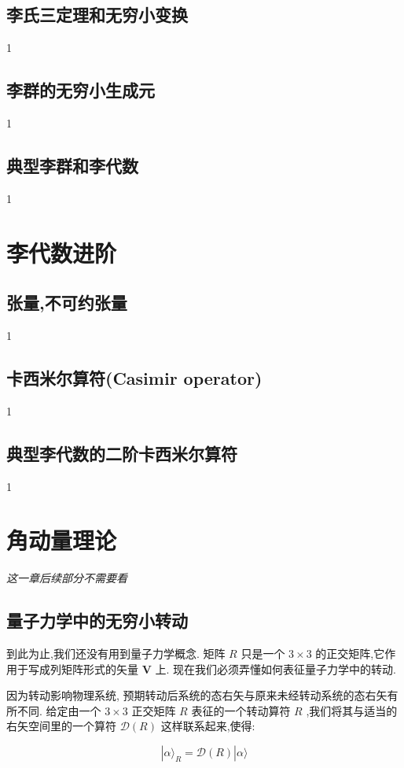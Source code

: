 \subsection{李氏三定理和无穷小变换}
1
\subsection{李群的无穷小生成元}
1
\subsection{典型李群和李代数}
1
\section{李代数进阶}
\subsection{张量,不可约张量}
1
\subsection{卡西米尔算符(Casimir operator)}
1
\subsection{典型李代数的二阶卡西米尔算符}
1


\section{角动量理论}
\textit{这一章后续部分不需要看}
\subsection{量子力学中的无穷小转动} 

到此为止,我们还没有用到量子力学概念. 矩阵 $R$ 只是一个 $3 \times 3$ 的正交矩阵,它作用于写成列矩阵形式的矢量 $\mathbf{V}$ 上. 现在我们必须弄懂如何表征量子力学中的转动.

因为转动影响物理系统, 预期转动后系统的态右矢与原来未经转动系统的态右矢有所不同. 给定由一个 $3 \times 3$ 正交矩阵 $R$ 表征的一个转动算符 $R$ ,我们将其与适当的右矢空间里的一个算符 $\mathcal{D}\left( R\right)$ 这样联系起来,使得:

$$
|\alpha {\rangle }_{R} = \mathcal{D}\left( R\right) |\alpha \rangle 
$$

